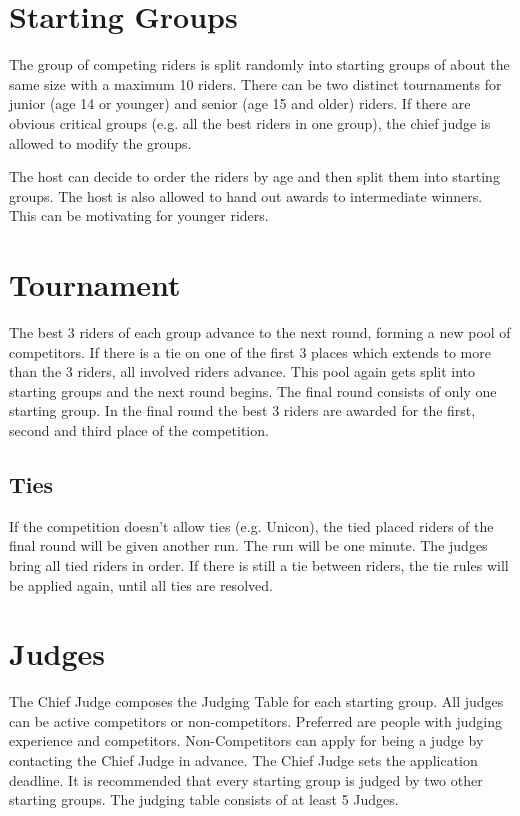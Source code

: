 \section{Starting Groups}
The group of competing riders is split randomly into starting groups of about the same size with a maximum 10 riders.
There can be two distinct tournaments for junior (age 14 or younger) and senior (age 15 and older) riders.
If there are obvious critical groups (e.g. all the best riders in one group), the chief judge is allowed to modify the groups.

The host can decide to order the riders by age and then split them into starting groups.
The host is also allowed to hand out awards to intermediate winners.
This can be motivating for younger riders.

\section{Tournament}
The best 3 riders of each group advance to the next round, forming a new pool of competitors.
If there is a tie on one of the first 3 places which extends to more than the 3 riders, all involved riders advance.
This pool again gets split into starting groups and the next round begins.
The final round consists of only one starting group.
In the final round the best 3 riders are awarded for the first, second and third place of the competition.

\subsection{Ties}
If the competition doesn't allow ties (e.g. Unicon), the tied placed riders of the final round will be given another run.
The run will be one minute.
The judges bring all tied riders in order.
If there is still a tie between riders, the tie rules will be applied again, until all ties are resolved.

\section{Judges}
The Chief Judge composes the Judging Table for each starting group.
All judges can be active competitors or non-competitors.
Preferred are people with judging experience and competitors.
Non-Competitors can apply for being a judge by contacting the Chief Judge in advance.
The Chief Judge sets the application deadline.
It is recommended that every starting group is judged by two other starting groups.
The judging table consists of at least 5 Judges.

